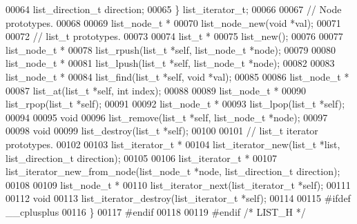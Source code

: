 \begin{DoxyCode}
00064   list\_direction\_t direction;
00065 \} list_iterator_t;
00066 
00067 \textcolor{comment}{// Node prototypes.}
00068 
00069 list_node_t *
00070 list_node_new(\textcolor{keywordtype}{void} *val);
00071 
00072 \textcolor{comment}{// list\_t prototypes.}
00073 
00074 list_t *
00075 list_new();
00076 
00077 list_node_t *
00078 list_rpush(list_t *\textcolor{keyword}{self}, list_node_t *node);
00079 
00080 list_node_t *
00081 list_lpush(list_t *\textcolor{keyword}{self}, list_node_t *node);
00082 
00083 list_node_t *
00084 list_find(list_t *\textcolor{keyword}{self}, \textcolor{keywordtype}{void} *val);
00085 
00086 list_node_t *
00087 list_at(list_t *\textcolor{keyword}{self}, \textcolor{keywordtype}{int} index);
00088 
00089 list_node_t *
00090 list_rpop(list_t *\textcolor{keyword}{self});
00091 
00092 list_node_t *
00093 list_lpop(list_t *\textcolor{keyword}{self});
00094 
00095 \textcolor{keywordtype}{void}
00096 list_remove(list_t *\textcolor{keyword}{self}, list_node_t *node);
00097 
00098 \textcolor{keywordtype}{void}
00099 list_destroy(list_t *\textcolor{keyword}{self});
00100 
00101 \textcolor{comment}{// list\_t iterator prototypes.}
00102 
00103 list_iterator_t *
00104 list_iterator_new(list_t *list, list\_direction\_t direction);
00105 
00106 list_iterator_t *
00107 list_iterator_new_from_node(list_node_t *node, list\_direction\_t direction);
00108 
00109 list_node_t *
00110 list_iterator_next(list_iterator_t *\textcolor{keyword}{self});
00111 
00112 \textcolor{keywordtype}{void}
00113 list_iterator_destroy(list_iterator_t *\textcolor{keyword}{self});
00114 
00115 \textcolor{preprocessor}{#ifdef \_\_cplusplus}
00116 \}
00117 \textcolor{preprocessor}{#endif}
00118 
00119 \textcolor{preprocessor}{#endif }\textcolor{comment}{/* LIST\_H */}\textcolor{preprocessor}{}
\end{DoxyCode}
